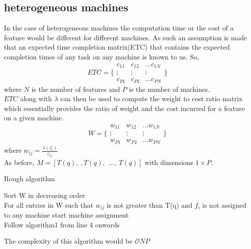 \documentclass[10pt, conference, compsocconf]{IEEEtran}
\begin{document}
\subsection{heterogeneous machines}
In the case of heterogeneous machines the computation time or the cost of a feature would be different for different machines. As such an assumption is made that an expected time completion matrix(ETC) that contains the expected completion times of any task on any machine is known to us. So, \\
$$ETC = \bigg \{\begin{smallmatrix} c_{11}&c_{12}& \dots c_{1N}\\  \vdots&\vdots&\vdots \\ c_{P1}&c_{P2}& \dots c_{PN} \end{smallmatrix} \bigg \}$$
where $N$ is the number of features and $P$ is the number of machines.\\
$ETC$ along with $\lambda$ can then be used to compute the weight to cost ratio matrix which essentially provides the ratio of weight and the cost incurred for a feature on a given machine. 
$$W = \bigg \{\begin{smallmatrix} w_{11}&w_{12}& \dots w_{1N}\\  \vdots&\vdots&\vdots \\ w_{P1}&w_{P2}& \dots w_{PN} \end{smallmatrix} \bigg \}$$
where $w_{ij} =\frac{\lambda(f_i)}{c_{ij}}$\\
As before,  $M =[T(q),\ ,T(q),\, \ \dots,\ T(q)]$ with dimensions $1\times P$. 
\begin{algorithm}[H]
 \caption{Rough algorithm}
\label {algo1}
 \begin{algorithmic}[1]
 \STATE Sort W in decreasing order\\
 \STATE For all entries in W such that $w_{ij}$ is not greater than T(q) and $f_i$ is not assigned to any machine start machine assignment\\
\STATE Follow algorithm1 from line 4 onwards
 \end{algorithmic}
 \end{algorithm}
The complexity of this algorithm would be $\mathcal{O}NP$
{\tiny
\newcommand{\BIBdecl}{\setlength{\itemsep}{0.2 em}}


}

\end{document}

